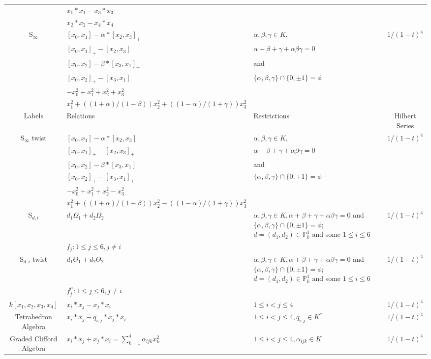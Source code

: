 \documentclass[12]{article}
\begin{document}
\begin{longtable}[c]{|c|p{5.25cm}|p{3.25cm}|c|}
   & $ x_1* x_1 - x_3* x_3  $ & & \\ 
   & $ x_2* x_2 - x_4* x_4 $ & &  \\  
\hline
S$_{\infty}$ & $ [x_0, x_1]  -  \alpha*[x_2, x_3]_{+}$ &$ \alpha, \beta, \gamma \in K,$  &\multirow{6}{*}{$ 1/(1-t)^4 $} \\ 
 & $[x_0, x_1]_{+}  -  [x_2, x_3] $ &$\alpha + \beta + \gamma +\alpha \beta \gamma = 0 $ &  \\ 
   & $ [x_0, x_2]  -   \beta *[x_3, x_1]_{+}	 $ &and & \\  
   & $ [x_0, x_2]_{+}  -  [x_3, x_1] $ & $ \{ \alpha, \beta, \gamma \} \cap \{0, \pm1\} = \phi $ & \\  
   & $  - x_{0}^{2} + x_{1}^{2} + x_{2}^{2} + x_{3}^{2}	
  $ & & \\ 
   & $  x_{1}^{2} + ((1 + \alpha)/(1 - \beta))x_{2}^{2} + ( (1 - \alpha)/(1 + \gamma))x_{3}^{2}	
 $ & &  \\  
 \hline
\pagebreak
\midrule[1.0pt]
Labels & Relations & Restrictions & Hilbert Series \\
 \hline
 S$_{\infty}$ twist & $ [x_0, x_1]  -  \alpha*[x_2, x_3]	$ &$ \alpha, \beta, \gamma \in K,$  &\multirow{6}{*}{$ 1/(1-t)^4 $} \\ 
 & $[x_0, x_1]_{+}  -  [x_2, x_3]_{+} $ &$\alpha + \beta + \gamma +\alpha \beta \gamma = 0 $  &  \\ 
   & $ [x_0, x_2]  -   \beta*[x_3, x_1] $ &and & \\  
   & $ [x_0, x_2]_{+}  -  [x_3, x_1]_{+} $ & $ \{ \alpha, \beta, \gamma \} \cap \{0, \pm1\} = \phi $ & \\  
   & $  - x_{0}^{2} + x_{1}^{2} + x_{2}^{2} - x_{3}^{2}	
  $ & & \\ 
   & $  x_{1}^{2} + ((1 + \alpha)/(1 - \beta))x_{2}^{2} - ( (1 - \alpha)/(1 + \gamma))x_{3}^{2}	
 $ & &  \\
 \hline
 S$_{d,i}$ & $ d_{1} \Omega_{1}+ d_{2} \Omega_{2} 	$ &$ \alpha, \beta, \gamma \in K, \alpha + \beta + \gamma +\alpha \beta \gamma = 0 $ and $ \{ \alpha, \beta, \gamma \} \cap \{0, \pm1\} = \phi $; \ $ d = (d_{1},d_{2}) \in  {\mathbb{P}}_{k}^{1}$ and some $1 \leq i \leq 6   $ & $ 1/(1-t)^4 $\\ 
 & $f_{j}: 1 \leq j \leq 6, j \neq i $ & &  \\ 
 \hline
 S$_{d,i}$ twist & $ d_{1} \Theta_{1}+ d_{2} \Theta_{2} 	$ &$ \alpha, \beta, \gamma \in K, \alpha + \beta + \gamma +\alpha \beta \gamma = 0 $ and $ \{ \alpha, \beta, \gamma \} \cap \{0, \pm1\} = \phi $; \ $ d = (d_{1},d_{2}) \in  {\mathbb{P}}_{k}^{1}$ and some $1 \leq i \leq 6   $ & $ 1/(1-t)^4 $\\ 
 & $f_{j}^{\mu}: 1 \leq j \leq 6, j \neq i $ & &  \\ 
\hline
$k[x_1,x_2,x_3,x_4]$ & $ x_i*x_j - x_j*x_i$ &$1 \leq i < j \leq 4$ &$ 1/(1-t)^4 $ \\ 
 \hline
Tetrahedron Algebra & $ x_i*x_j - q_{i,j} * x_j*x_i$ &$1 \leq i < j \leq 4,q_{i,j} \in K^{*}$ &$ 1/(1-t)^4 $ \\
\hline 
Graded Clifford Algebra & $x_i*x_j + x_j*x_i = \sum_{k=1}^{4} \alpha_{ijk} x_{k}^{2}$ & $1 \leq i < j \leq 4, \alpha_{ijk} \in K$ & $ 1/(1-t)^4 $\\
   
\bottomrule
\end{longtable}
\end{document}
